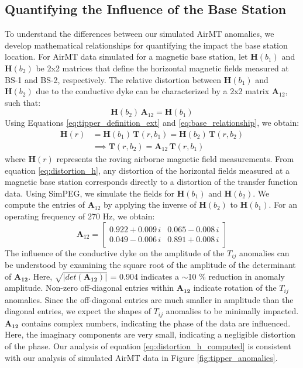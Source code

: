 \documentclass{segabs}
\begin{document}
\subsection{Quantifying the Influence of the Base Station}

To understand the differences between our simulated AirMT anomalies, we develop mathematical relationships for quantifying the impact the base station location. For AirMT data simulated for a magnetic base station, let $\mathbf{H}(b_1)$ and $\mathbf{H}(b_2)$ be 2x2 matrices that define the horizontal magnetic fields measured at BS-1 and BS-2, respectively. The relative distortion between $\mathbf{H}(b_1)$ and $\mathbf{H}(b_2)$ due to the conductive dyke can be characterized by a 2x2 matrix $\mathbf{A}_{12}$, such that:
\begin{equation}
\label{eq:base_relationship}
\mathbf{H}(b_2) \, \mathbf{A}_{12} = \mathbf{H}(b_1)
\end{equation}
Using Equations \ref{eq:tipper_definition_ext} and \ref{eq:base_relationship}, we obtain:
\begin{equation}
\label{eq:distortion_h}
\begin{split}
\mathbf{H}(r) &= \mathbf{H}(b_1) \, \mathbf{T}(r, b_1) = \mathbf{H}(b_2) \, \mathbf{T}(r, b_2)\\
&\implies \mathbf{T}(r, b_2) = \mathbf{A}_{12} \, \mathbf{T}(r, b_1)
\end{split}
\end{equation}
where $\mathbf{H}(r)$ represents the roving airborne magnetic field measurements. From equation \ref{eq:distortion_h}, any distortion of the horizontal fields measured at a magnetic base station corresponds directly to a distortion of the transfer function data.
Using SimPEG, we simulate the fields for $\mathbf{H}(b_1)$ and $\mathbf{H}(b_2)$. We compute the entries of $\mathbf{A}_{12}$ by applying the inverse of $\mathbf{H}(b_2)$ to $\mathbf{H}(b_1)$. For an operating frequency of 270 Hz, we obtain:
\begin{equation}
\label{eq:distortion_h_computed}
\mathbf{A}_{12} = \begin{bmatrix}
0.922+0.009 \, i & 0.065 - 0.008 \, i \\
0.049- 0.006 \, i & 0.891+ 0.008 \, i
\end{bmatrix}
\end{equation}
The influence of the conductive dyke on the amplitude of the $T_{ij}$ anomalies can be understood by examining the square root of the amplitude of the determinant of $\mathbf{A_{12}}$. Here, $\sqrt{|det(\mathbf{A_{12}})|}$ = 0.904 indicates a $\sim$10 \% reduction in anomaly amplitude. Non-zero off-diagonal entries within $\mathbf{A_{12}}$ indicate rotation of the $T_{ij}$ anomalies. Since the off-diagonal entries are much smaller in amplitude than the diagonal entries, we expect the shapes of $T_{ij}$ anomalies to be minimally impacted. $\mathbf{A_{12}}$ contains complex numbers, indicating the phase of the data are influenced. Here, the imaginary components are very small, indicating a negligible distortion of the phase. Our analysis of equation \ref{eq:distortion_h_computed} is consistent with our analysis of simulated AirMT data in Figure \ref{fig:tipper_anomalies}.
\end{document}
